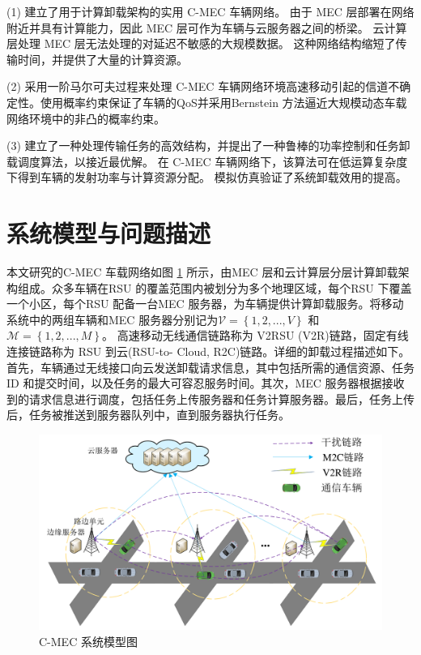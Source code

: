 (1) 建立了用于计算卸载架构的实用 C-MEC 车辆网络。 由于 MEC 层部署在网络附近并具有计算能力，因此 MEC 层可作为车辆与云服务器之间的桥梁。 云计算层处理 MEC 层无法处理的对延迟不敏感的大规模数据。 这种网络结构缩短了传输时间，并提供了大量的计算资源。

(2) 采用一阶马尔可夫过程来处理 C-MEC 车辆网络环境高速移动引起的信道不确定性。使用概率约束保证了车辆的QoS并采用Bernstein 方法逼近大规模动态车载网络环境中的非凸的概率约束。

(3) 建立了一种处理传输任务的高效结构，并提出了一种鲁棒的功率控制和任务卸载调度算法，以接近最优解。 在 C-MEC 车辆网络下，该算法可在低运算复杂度下得到车辆的发射功率与计算资源分配。 模拟仿真验证了系统卸载效用的提高。
\section{系统模型与问题描述}\label{section3-2}
本文研究的C-MEC 车载网络如图 \ref{F1} 所示，由MEC 层和云计算层分层计算卸载架构组成。众多车辆在RSU 的覆盖范围内被划分为多个地理区域，每个RSU 下覆盖一个小区，每个RSU 配备一台MEC 服务器，为车辆提供计算卸载服务。将移动系统中的两组车辆和MEC 服务器分别记为$\mathcal{V}=\left\{1,2,..., V\right\}$ 和$\mathcal{M}=\left\{1,2,..., M\right\}$。 高速移动无线通信链路称为 V2RSU (V2R)链路，固定有线连接链路称为 RSU 到云(RSU-to-
Cloud, R2C)链路。详细的卸载过程描述如下。首先，车辆通过无线接口向云发送卸载请求信息，其中包括所需的通信资源、任务 ID 和提交时间，以及任务的最大可容忍服务时间。其次，MEC 服务器根据接收到的请求信息进行调度，包括任务上传服务器和任务计算服务器。最后，任务上传后，任务被推送到服务器队列中，直到服务器执行任务。
\begin{figure}[H]
\centering
\includegraphics[width=12cm]{figures//chap3//文章一在用model2.pdf}
\caption{C-MEC 系统模型图}
\label{F1}
\end{figure}

